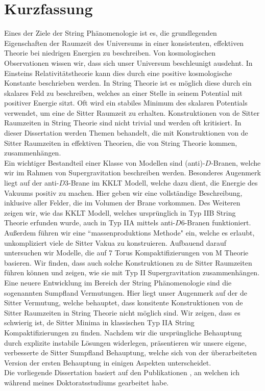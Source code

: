 \documentclass[a4paper,12pt]{report}
\begin{document}
\section*{Kurzfassung}
Eines der Ziele der String Phänomenologie ist es, die grundlegenden Eigenschaften der Raumzeit des Universums in einer konsistenten, effektiven Theorie bei niedrigen Energien zu beschreiben. Von kosmologischen Observationen wissen wir, dass sich unser Universum beschleunigt ausdehnt. In Einsteins Relativitätstheorie kann dies durch eine positive kosmologische Konstante beschrieben werden. In String Theorie ist es möglich diese durch ein skalares Feld zu beschreiben, welches an einer Stelle in seinem Potential mit positiver Energie sitzt. Oft wird ein stabiles Minimum des skalaren Potentials verwendet, um eine de Sitter Raumzeit zu erhalten. Konstruktionen von de Sitter Raumzeiten in String Theorie sind nicht trivial und werden oft kritisiert. In dieser Dissertation werden Themen behandelt, die mit Konstruktionen von de Sitter Raumzeiten in effektiven Theorien, die von String Theorie kommen, zusammenhängen.\\
Ein wichtiger Bestandteil einer Klasse von Modellen sind (anti)-$D$-Branen, welche wir im Rahmen von Supergravitation beschreiben werden. Besonderes Augenmerk liegt auf der anti-$D3$-Brane im KKLT Modell, welche dazu dient, die Energie des Vakuums positiv zu machen. Hier geben wir eine vollständige Beschreibung, inklusive aller Felder, die im Volumen der Brane vorkommen. Des Weiteren zeigen wir, wie das KKLT Modell, welches ursprünglich in Typ IIB String Theorie erfunden wurde, auch in Typ IIA mittels anti-$D6$-Branen funktioniert. Außerdem führen wir eine ``massenproduktions Methode" ein, welche es erlaubt, unkompliziert viele de Sitter Vakua zu konstruieren. Aufbauend darauf untersuchen wir Modelle, die auf 7 Torus Kompaktifizierungen von M Theorie basieren. Wir finden, dass auch solche Konstruktionen zu de Sitter Raumzeiten führen können und zeigen, wie sie mit Typ II Supergravitation zusammenhängen.\\
Eine neuere Entwicklung im Bereich der String Phänomenologie sind die sogenannten Sumpfland Vermutungen. Hier liegt unser Augenmerk auf der de Sitter Vermutung, welche behauptet, dass konsitente Konstruktionen von de Sitter Raumzeiten in String Theorie nicht möglich sind. Wir zeigen, dass es schwierig ist, de Sitter Minima in klassischen Typ IIA String Kompaktifizierungen zu finden. Nachdem wir die ursprüngliche Behauptung durch explizite instabile Lösungen widerlegen, präsentieren wir unsere eigene, verbesserte de Sitter Sumpfland Behauptung, welche sich von der überarbeiteten Version der ersten Behauptung in einigen Aspekten unterscheidet.\vspace{12pt}\\
Die vorliegende Dissertation basiert auf den Publikationen \cite{Roupec:2018mbn,Banlaki:2018ayh,Andriot:2018mav,Cribiori:2019hod,Cribiori:2019bfx,Cribiori:2019drf,Cribiori:2019hrb,Cribiori:2020bgt}, an welchen ich während meines Doktoratsstudiums gearbeitet habe.
\end{document}
